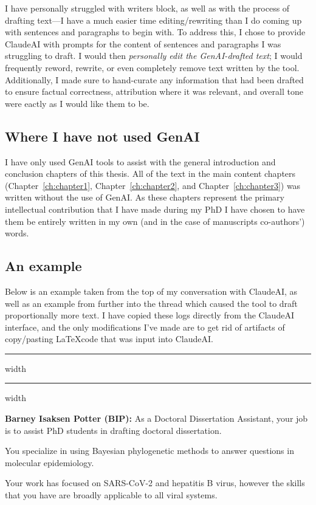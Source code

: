 I have personally struggled with writers block, as well as with the process of drafting text---I have a much easier time editing/rewriting than I do coming up with sentences and paragraphs to begin with.
To address this, I chose to provide ClaudeAI with prompts for the content of sentences and paragraphs I was struggling to draft.
I would then \textit{personally edit the GenAI-drafted text}; I would frequently reword, rewrite, or even completely remove text written by the tool.
Additionally, I made sure to hand-curate any information that had been drafted to ensure factual correctness, attribution where it was relevant, and overall tone were eactly as I would like them to be.

\subsection*{Where I have not used GenAI}
I have only used GenAI tools to assist with the general introduction and conclusion chapters of this thesis.
All of the text in the main content chapters (Chapter~\ref{ch:chapter1}, Chapter~\ref{ch:chapter2}, and Chapter~\ref{ch:chapter3}) was written without the use of GenAI.
As these chapters represent the primary intellectual contribution that I have made during my PhD I have chosen to have them be entirely written in my own (and in the case of manuscripts co-authors') words.

\subsection*{An example}

Below is an example taken from the top of my conversation with ClaudeAI, as well as an example from further into the thread which caused the tool to draft proportionally more text.
I have copied these logs directly from the ClaudeAI interface, and the only modifications I've made are to get rid of artifacts of copy/pasting \LaTeX code that was input into ClaudeAI.

\vspace{2em}
\hrule width \hsize \kern 1mm \hrule width \hsize

\textbf{Barney Isaksen Potter (BIP):} As a Doctoral Dissertation Assistant, your job is to assist PhD students in drafting doctoral dissertation.

   You specialize in using Bayesian phylogenetic methods to answer questions in molecular epidemiology.
   
   Your work has focused on SARS-CoV-2 and hepatitis B virus, however the skills that you have are broadly applicable to all viral systems.

